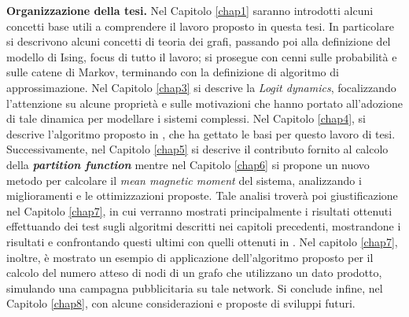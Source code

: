 \textbf{Organizzazione della tesi.}
Nel Capitolo \ref{chap1} saranno introdotti alcuni concetti base utili a comprendere il lavoro proposto in questa tesi. In particolare si descrivono alcuni concetti di teoria dei grafi, passando poi alla definizione del modello di Ising, focus di tutto il lavoro; si prosegue con cenni sulle probabilità e sulle catene di Markov, terminando con la definizione di algoritmo di approssimazione. Nel Capitolo \ref{chap3} si descrive la \textit{Logit dynamics}, focalizzando l’attenzione su alcune proprietà e sulle motivazioni che hanno portato all’adozione di tale dinamica per modellare i sistemi complessi. Nel Capitolo \ref{chap4}, si descrive l’algoritmo proposto in \cite{jerrum1993polynomial}, che ha gettato le basi per questo lavoro di tesi. Successivamente, nel Capitolo \ref{chap5} si descrive il contributo fornito al calcolo della \textit{\textbf{partition function}} mentre nel Capitolo \ref{chap6} si propone un nuovo metodo per calcolare il \textit{mean magnetic moment} del sistema, analizzando i miglioramenti e le ottimizzazioni proposte. Tale analisi troverà poi giustificazione nel Capitolo \ref{chap7}, in cui verranno mostrati principalmente i risultati ottenuti effettuando dei test sugli algoritmi descritti nei capitoli precedenti, mostrandone i risultati e confrontando questi ultimi con quelli ottenuti in \cite{rinaldi2016approximation}. Nel capitolo \ref{chap7}, inoltre, è mostrato un esempio di applicazione dell’algoritmo proposto per il calcolo del numero atteso di nodi di un grafo che utilizzano un dato prodotto, simulando una campagna pubblicitaria su tale network. Si conclude infine, nel Capitolo \ref{chap8}, con alcune considerazioni e proposte di sviluppi futuri.
